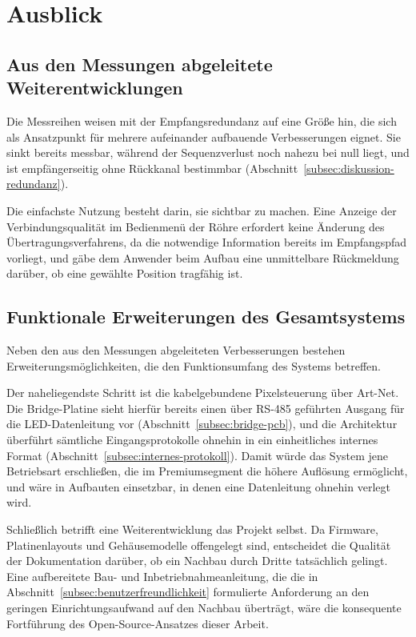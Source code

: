 \section{Ausblick}
\label{sec:ausblick}

\subsection{Aus den Messungen abgeleitete Weiterentwicklungen}
\label{subsec:ausblick-messungen}

Die Messreihen weisen mit der Empfangsredundanz auf eine Größe hin, die sich als
Ansatzpunkt für mehrere aufeinander aufbauende Verbesserungen eignet. Sie sinkt
bereits messbar, während der Sequenzverlust noch nahezu bei null liegt, und ist
empfängerseitig ohne Rückkanal bestimmbar
(Abschnitt~\ref{subsec:diskussion-redundanz}).

Die einfachste Nutzung besteht darin, sie sichtbar zu machen. Eine Anzeige der
Verbindungsqualität im Bedienmenü der Röhre erfordert keine Änderung des
Übertragungsverfahrens, da die notwendige Information bereits im Empfangspfad
vorliegt, und gäbe dem Anwender beim Aufbau eine unmittelbare Rückmeldung darüber,
ob eine gewählte Position tragfähig ist.

\subsection{Funktionale Erweiterungen des Gesamtsystems}
\label{subsec:ausblick-funktional}

Neben den aus den Messungen abgeleiteten Verbesserungen bestehen
Erweiterungsmöglichkeiten, die den Funktionsumfang des Systems betreffen.

Der naheliegendste Schritt ist die kabelgebundene Pixelsteuerung über Art-Net. Die
Bridge-Platine sieht hierfür bereits einen über RS-485 geführten Ausgang für die
LED-Datenleitung vor (Abschnitt~\ref{subsec:bridge-pcb}), und die Architektur
überführt sämtliche Eingangsprotokolle ohnehin in ein einheitliches internes
Format (Abschnitt~\ref{subsec:internes-protokoll}). Damit würde das System jene
Betriebsart erschließen, die im Premiumsegment die höhere Auflösung ermöglicht,
und wäre in Aufbauten einsetzbar, in denen eine Datenleitung ohnehin verlegt wird.

Schließlich betrifft eine Weiterentwicklung das Projekt selbst. Da Firmware,
Platinenlayouts und Gehäusemodelle offengelegt sind, entscheidet die Qualität der
Dokumentation darüber, ob ein Nachbau durch Dritte tatsächlich gelingt. Eine
aufbereitete Bau- und Inbetriebnahmeanleitung, die die in
Abschnitt~\ref{subsec:benutzerfreundlichkeit} formulierte Anforderung an den
geringen Einrichtungsaufwand auf den Nachbau überträgt, wäre die konsequente
Fortführung des Open-Source-Ansatzes dieser Arbeit.
